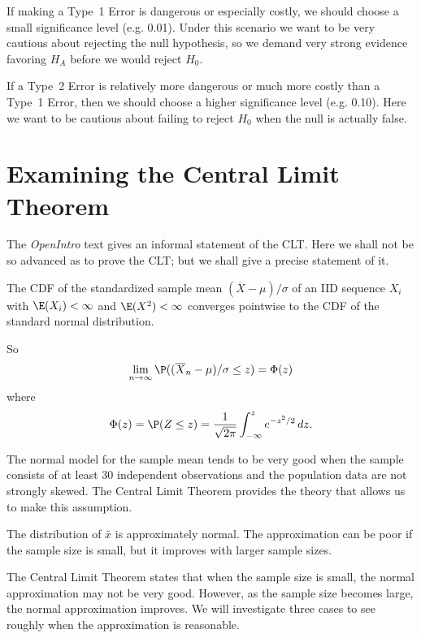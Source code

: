 If making a Type~1 Error is dangerous or especially costly, we should choose a small significance level (e.g. 0.01). Under this scenario we want to be very cautious about rejecting the null hypothesis, so we demand very strong evidence favoring $H_A$ before we would reject $H_0$.

If a Type~2 Error is relatively more dangerous or much more costly than a Type~1 Error, then we should choose a higher significance level (e.g. 0.10). Here we want to be cautious about failing to reject $H_0$ when the null is actually false.






\section{Examining the Central Limit Theorem}
\label{cltSection}



The \emph{OpenIntro} text gives an informal statement of the CLT. Here we shall not be so advanced as to prove the CLT; but we shall give a precise statement of it.

The CDF of the standardized sample mean $(\overline X-\mu)/\sigma$ of an IID sequence $X_i$ with $\E(X_i)<\infty$ and $\E(X^2)<\infty$ converges pointwise to the CDF of the standard normal distribution.

So
\[
	\lim_{n\to\infty} \P((\overline X_n-\mu)/\sigma\le z) = \Phi(z)
\]
where
\[
	\Phi(z)=\P(Z\le z)=\frac1{\sqrt{2\pi}}\int_{-\infty}^z e^{-z^2/2}\,dz.
\]

The normal model for the sample mean tends to be very good when the sample consists of at least 30 independent observations and the population data are not strongly skewed. The Central Limit Theorem provides the theory that allows us to make this assumption.

\begin{termBox}{
The distribution of $\bar{x}$ is approximately normal. The approximation can be poor if the sample size is small, but it improves with larger sample sizes.}
\end{termBox}

The Central Limit Theorem states that when the sample size is small, the normal approximation may not be very good. However, as the sample size becomes large, the normal approximation improves. We will investigate three cases to see roughly when the approximation is reasonable.

